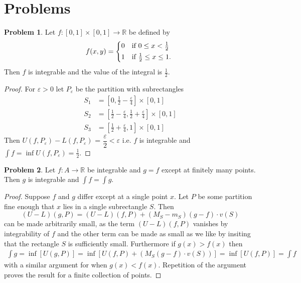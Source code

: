 \documentclass[20pt]{article}
\theoremstyle{plain}
\theoremstyle{definition}
\newtheorem*{problem}{Problem}
\newcommand{\reals}{\mathbb{R}}
\begin{document}
\break
\section{Problems}

\begin{problem}{3.1}
  Let $f: [0,1] \times [0, 1] \to \reals$ be defined by
 \begin{equation*}
    f(x, y) =
    \begin{cases*}
      0 & if $0 \leq x < \frac{1}{2}$ \\
      1 & if $ \frac{1}{2} \leq x \leq 1 $.
    \end{cases*}
  \end{equation*}
Then $f$ is integrable and the value of the integral is $\frac{1}{2}.$
\end{problem}

\begin{proof}
  For $\varepsilon > 0$ let $P_\varepsilon$ be the partition with subrectangles 
  \begin{align*}
    S_1 &= [0, \frac{1}{2} - \frac{\varepsilon}{4}] \times [0, 1] \\
    S_2 &= [\frac{1}{2} -\frac{\varepsilon}{4}, \frac{1}{2} + \frac{\varepsilon}{4}] \times [0, 1] \\
    S_3 &= [\frac{1}{2} + \frac{\varepsilon}{4}, 1] \times [0, 1]
   \end{align*}
   Then 
   $U(f, P_\varepsilon) - L(f, P_\varepsilon)$ = $\dfrac{\varepsilon}{2} < \varepsilon$ 
   i.e. $f$ is integrable
   and $\int f = \inf U(f, P_\varepsilon) = \frac{1}{2}.$
\end{proof}


\begin{problem}{3.2}
  Let $f: A \to \reals$ be integrable and $g = f$ except at finitely many points.
  Then $g$ is integrable and $\int f = \int g.$
\end{problem}

\begin{proof}
  Suppose $f$ and $g$ differ except at a single point $x$.
  Let $P$ be some partition fine enough that $x$ lies in a single 
  subrectangle $S$. Then
  $$(U-L)(g, P) = (U-L)(f, P) + (M_S-m_S)(g-f)\cdot v(S)$$
  can be made arbitrarily small, as the term $(U-L)(f, P)$ vanishes by 
  integrability of $f$ and the other term can be made as small
  as we like by insiting that the rectangle $S$ is sufficiently small. 
  Furthermore if $g(x) > f(x)$ then 
  \begin{align*}
    \int g = \inf [U(g, P)] = \inf[ U(f, P) + (M_S(g - f)\cdot v(S))] = \inf[U(f, P)] = \int f
  \end{align*}
  with a similar argument for when $g(x) < f(x).$  
  Repetition of the argument proves the result for a finite collection of 
  points.
\end{proof}
\end{document}
